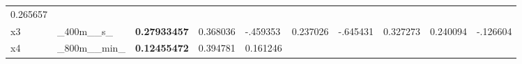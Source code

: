 \documentclass[11pt]{article}
\begin{document}
\begin{longtable}[]{@{}llllllllll@{}}
\begin{minipage}[t]{0.07\columnwidth}
0.265657\strut
\end{minipage}\tabularnewline
\begin{minipage}[t]{0.07\columnwidth}\raggedright
x3\strut
\end{minipage} & \begin{minipage}[t]{0.07\columnwidth}\raggedright
\_400m\_\_s\_\strut
\end{minipage} & \begin{minipage}[t]{0.07\columnwidth}\raggedright
\textbf{0.27933457}\strut
\end{minipage} & \begin{minipage}[t]{0.07\columnwidth}\raggedright
0.368036\strut
\end{minipage} & \begin{minipage}[t]{0.07\columnwidth}\raggedright
-.459353\strut
\end{minipage} & \begin{minipage}[t]{0.07\columnwidth}\raggedright
0.237026\strut
\end{minipage} & \begin{minipage}[t]{0.07\columnwidth}\raggedright
-.645431\strut
\end{minipage} & \begin{minipage}[t]{0.07\columnwidth}\raggedright
0.327273\strut
\end{minipage} & \begin{minipage}[t]{0.07\columnwidth}\raggedright
0.240094\strut
\end{minipage} & \begin{minipage}[t]{0.07\columnwidth}\raggedright
-.126604\strut
\end{minipage}\tabularnewline
\begin{minipage}[t]{0.07\columnwidth}\raggedright
x4\strut
\end{minipage} & \begin{minipage}[t]{0.07\columnwidth}\raggedright
\_800m\_\_min\_\strut
\end{minipage} & \begin{minipage}[t]{0.07\columnwidth}\raggedright
\textbf{0.12455472}\strut
\end{minipage} & \begin{minipage}[t]{0.07\columnwidth}\raggedright
0.394781\strut
\end{minipage} & \begin{minipage}[t]{0.07\columnwidth}\raggedright
0.161246\strut
\end{minipage} & \begin{minipage}[t]{0.07\columnwidth}\raggedright

\end{minipage}
\end{longtable}
\end{document}
